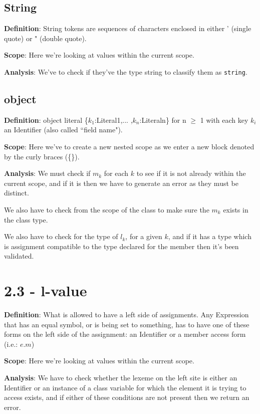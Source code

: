 \documentclass[11pt, oneside]{article}
\begin{document}
\subsection*{String}
\par \textbf{Definition}: String tokens are sequences of characters enclosed in either ' (single quote) or " (double quote).
\par \textbf{Scope}: Here we're looking at values within the current scope.
\par \textbf{Analysis}: We've to check if they've the type string to classify them as  \texttt{string}.

\subsection*{object}
\par \textbf{Definition}: object literal \{$k_1$:Literal1,... ,$k_n$:Literaln\} for n $\geq$ 1 with each key $k_i$ an Identifier (also called ``field name").
\par \textbf{Scope}: Here we've to create a new nested scope as we enter a new block denoted by the curly braces (\{\}).
\par \textbf{Analysis}: We must check if $m_k$ for each $k$ to see if it is not already within the current scope, and if it is then we have to generate an error as they must be distinct.
\par We also have to check from the scope of the class to make sure the $m_k$ exists in the class type.
\par We also have to check for the type of $l_k$, for a given $k$, and if it has a type which is assignment compatible to the type declared for the member then it's been validated.

\section*{2.3 - l-value}
\par \textbf{Definition}: What is allowed to have a left side of assignments. Any Expression that has an equal symbol, or is being set to something, has to have one of these forms on the left side of the assignment: an Identifier or a member access form (i.e.: $e.m$)
\par \textbf{Scope}: Here we're looking at values within the current scope.
\par \textbf{Analysis}: We have to check whether the lexeme on the left site is either an Identifier or an instance of a class variable for which the element it is trying to access exists, and if either of these conditions are not present then we return an error.
\end{document}
